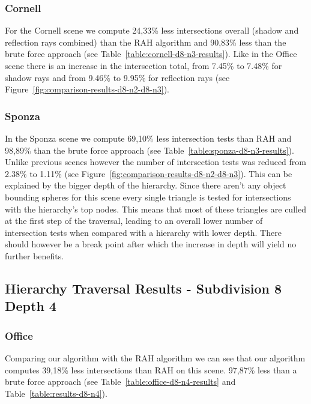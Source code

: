 \subsubsection{Cornell}

For the Cornell scene we compute 24,33\% less intersections overall (shadow and reflection rays combined) than the RAH algorithm and 90,83\% less than the brute force approach (see Table~\ref{table:cornell-d8-n3-results}). Like in the Office scene there is an increase in the intersection total, from 7.45\% to 7.48\% for shadow rays and from 9.46\% to 9.95\% for reflection rays (see Figure~\ref{fig:comparison-results-d8-n2-d8-n3}).

\subsubsection{Sponza}

In the Sponza scene we compute 69,10\% less intersection tests than RAH and 98,89\% than the brute force approach (see Table~\ref{table:sponza-d8-n3-results}). Unlike previous scenes however the number of intersection tests was reduced from 2.38\% to 1.11\% (see Figure~\ref{fig:comparison-results-d8-n2-d8-n3}). This can be explained by the bigger depth of the hierarchy. Since there aren't any object bounding spheres for this scene every single triangle is tested for intersections with the hierarchy's top nodes. This means that most of these triangles are culled at the first step of the traversal, leading to an overall lower number of intersection tests when compared with a hierarchy with lower depth. There should however be a break point after which the increase in depth will yield no further benefits.


\pagebreak
\subsection{Hierarchy Traversal Results - Subdivision 8 Depth 4}

\subsubsection{Office}


Comparing our algorithm with the RAH algorithm we can see that our algorithm computes 39,18\% less intersections than RAH on this scene. 97,87\% less than a brute force approach (see Table~\ref{table:office-d8-n4-results} and Table~\ref{table:results-d8-n4}).

